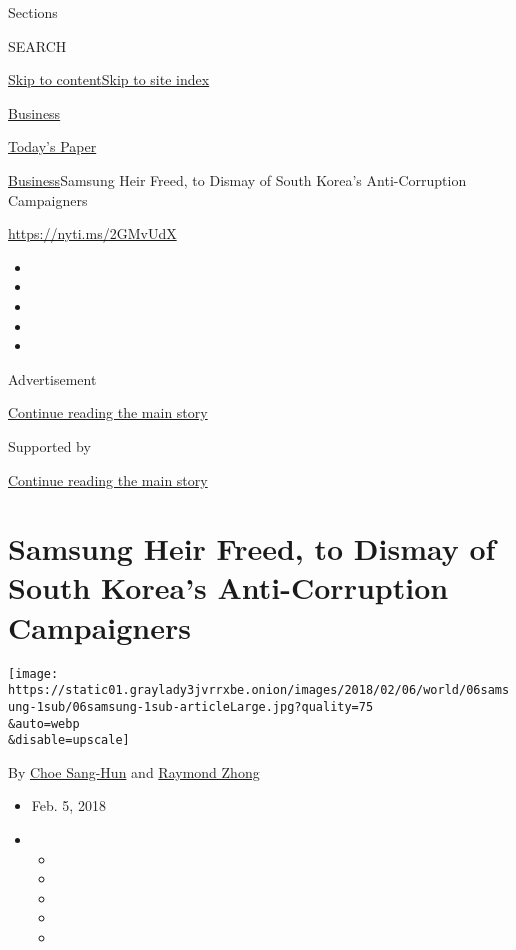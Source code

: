 Sections

SEARCH

\protect\hyperlink{site-content}{Skip to
content}\protect\hyperlink{site-index}{Skip to site index}

\href{https://www.nytimes3xbfgragh.onion/section/business}{Business}

\href{https://myaccount.nytimes3xbfgragh.onion/auth/login?response_type=cookie\&client_id=vi}{}

\href{https://www.nytimes3xbfgragh.onion/section/todayspaper}{Today's
Paper}

\href{/section/business}{Business}\textbar{}Samsung Heir Freed, to
Dismay of South Korea's Anti-Corruption Campaigners

\url{https://nyti.ms/2GMvUdX}

\begin{itemize}
\item
\item
\item
\item
\item
\end{itemize}

Advertisement

\protect\hyperlink{after-top}{Continue reading the main story}

Supported by

\protect\hyperlink{after-sponsor}{Continue reading the main story}

\hypertarget{samsung-heir-freed-to-dismay-of-south-koreas-anti-corruption-campaigners}{%
\section{Samsung Heir Freed, to Dismay of South Korea's Anti-Corruption
Campaigners}\label{samsung-heir-freed-to-dismay-of-south-koreas-anti-corruption-campaigners}}

\texttt{[image: https://static01.graylady3jvrrxbe.onion/images/2018/02/06/world/06samsung-1sub/06samsung-1sub-articleLarge.jpg?quality=75\\\&auto=webp\\\&disable=upscale]}

By \href{https://www.nytimes3xbfgragh.onion/by/choe-sang-hun}{Choe
Sang-Hun} and
\href{https://www.nytimes3xbfgragh.onion/by/raymond-zhong}{Raymond
Zhong}

\begin{itemize}
\item
  Feb. 5, 2018
\item
  \begin{itemize}
  \item
  \item
  \item
  \item
  \item
  \end{itemize}
\end{itemize}

